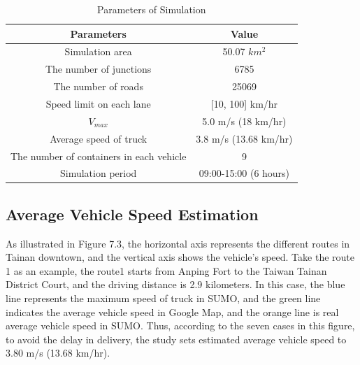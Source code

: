 \documentclass[12pt]{ksthesis}
\begin{document}
\begin{thesis}
{%

\begin{table}
\vspace{0.5cm}
\large
\centering
\caption{\large Parameters of Simulation}

\begin{tabular}{|c|c|} \hline\hline 

\textbf{Parameters}&\textbf{Value}\\ 
\hline  
Simulation area & 50.07 $km^{2}$ \\
\hline
The number of junctions & 6785\\
\hline 
The number of roads & 25069\\
\hline 
Speed limit on each lane & [10, 100] km/hr\\
\hline 
$V_{max}$& 5.0 m/s (18 km/hr) \\
\hline 
Average speed of truck & 3.8 m/s (13.68 km/hr)\\
\hline 
The number of containers in each vehicle & 9\\
\hline 
Simulation period & 09:00-15:00 (6 hours)\\

\hline
 
\end{tabular}

\end{table}

\subsection{Average Vehicle Speed Estimation}

As illustrated in Figure 7.3, the horizontal axis represents the different routes in Tainan downtown, and the vertical axis shows the vehicle's speed. Take the route 1 as an example, the route1 starts from Anping Fort to the Taiwan Tainan District Court, and the driving distance is 2.9 kilometers. In this case, the blue line represents the maximum speed of truck in SUMO, and the green line indicates the average vehicle speed in Google Map, and the orange line is real average vehicle speed in SUMO. Thus, according to the seven cases in this figure, to avoid the delay in delivery, the study sets estimated average vehicle speed to 3.80 m/s (13.68 km/hr).


}
\end{thesis}
\end{document}
